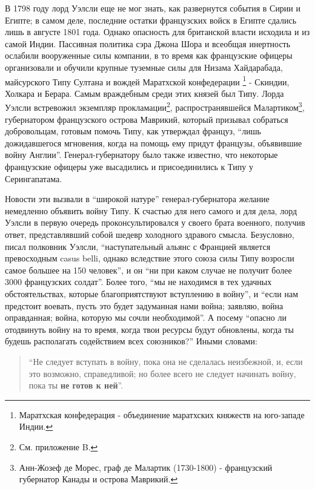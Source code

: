 \documentclass[
  oneside,
  12pt,
  titlepage]{book}
\begin{document}
В 1798 году лорд Уэлсли еще не мог знать, как развернутся события в Сирии и Египте; в самом деле, последние остатки французских войск в Египте сдались лишь в августе 1801 года. Однако опасность для британской власти исходила и из самой Индии. Пассивная политика сэра Джона Шора и всеобщая инертность ослабили вооруженные силы компании, в то время как французские офицеры организовали и обучили крупные туземные силы для Низама Хайдарабада, майсурского Типу Султана и вождей Маратхской конфедерации \footnote{Маратхская конфедерация - объединение маратхских княжеств на юго-западе Индии.} - Скиндии, Холкара и Берара. Самым враждебным среди этих князей был Типу. Лорда Уэлсли встревожил экземпляр прокламации\footnote{См. приложение B.}, распространявшейся Малартиком\footnote{Анн-Жозеф де Морес, граф де Малартик (1730-1800) - французский губернатор Канады и острова Маврикий.}, губернатором французского острова Маврикий, который призывал собраться добровольцам, готовым помочь Типу, как утверждал француз, ``лишь дожидавшегося мгновения, когда на помощь ему придут французы, объявившие войну Англии''. Генерал-губернатору было также известно, что некоторые французские офицеры уже высадились и присоединились к Типу у Серингапатама.

Новости эти вызвали в ``широкой натуре'' генерал-губернатора желание немедленно объявить войну Типу. К счастью для него самого и для дела, лорд Уэлсли в первую очередь проконсультировался у своего брата военного, получив ответ, представлявший собой шедевр холодного здравого смысла. Безусловно, писал полковник Уэлсли, ``наступательный альянс с Францией является превосходным casus belli, однако вследствие этого союза силы Типу возросли самое большее на 150 человек'', и он ``ни при каком случае не получит более 3000 французских солдат''. Более того, ``мы не находимся в тех удачных обстоятельствах, которые благоприятствуют вступлению в войну'', и ``если нам предстоит воевать, пусть это будет задуманная нами война; заявляю, война оправданная; война, которую мы сочли необходимой''. А посему ``опасно ли отодвинуть войну на то время, когда твои ресурсы будут обновлены, когда ты будешь располагать содействием всех союзников?'' Иными словами:

\begin{quote}
``Не следует вступать в войну, пока она не сделалась неизбежной, и, если это возможно, справедливой; но более всего не следует начинать войну, пока ты \textbf{не готов к ней}''.
\end{quote}
\end{document}

